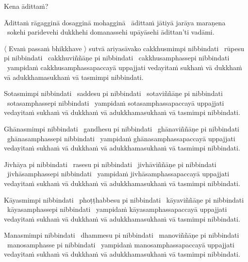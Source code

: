 Kena ādittaṁ?

\begin{pali-hang}
  Ādittaṁ rāgagginā dosagginā mohagginā \breathmark\ ādittaṁ jātiyā jarāya maraṇena \breathmark\ sokehi paridevehi dukkhehi domanassehi upāyāsehi ādittan'ti vadāmi.
\end{pali-hang}

\begin{pali-hang}
  〈 Evaṁ passaṁ bhikkhave 〉 sutvā ariyasāvako cakkhusmimpi nibbindati \breathmark\ rūpesu pi nibbindati \breathmark\ cakkhuviññāṇe pi nibbindati \breathmark\ cakkhusamphassepi nibbindati \breathmark\ yampidaṁ cakkhusamphassapaccayā uppajjati vedayitaṁ sukhaṁ vā dukkhaṁ vā adukkhamasukhaṁ vā tasmimpi nibbindati.
\end{pali-hang}

\begin{pali-hang}
  Sotasmimpi nibbindati \breathmark\ saddesu pi nibbindati \breathmark\ sotaviññāṇe pi nibbindati \breathmark\ sotasamphassepi nibbindati \breathmark\ yampidaṁ sotasamphassapaccayā uppajjati vedayitaṁ sukhaṁ vā dukkhaṁ vā adukkhamasukhaṁ vā tasmimpi nibbindati.
\end{pali-hang}

\begin{pali-hang}
  Ghānasmimpi nibbindati \breathmark\ gandhesu pi nibbindati \breathmark\ ghānaviññāṇe pi nibbindati \breathmark\ ghānasamphassepi nibbindati \breathmark\ yampidaṁ ghānasamphassapaccayā uppajjati vedayitaṁ sukhaṁ vā dukkhaṁ vā adukkhamasukhaṁ vā tasmimpi nibbindati.
\end{pali-hang}

\begin{pali-hang}
  Jivhāya pi nibbindati \breathmark\ rasesu pi nibbindati \breathmark\ jivhāviññāṇe pi nibbindati \breathmark\ jivhāsamphassepi nibbindati \breathmark\ yampidaṁ jivhāsamphassapaccayā uppajjati vedayitaṁ sukhaṁ vā dukkhaṁ vā adukkhamasukhaṁ vā tasmimpi nibbindati.
\end{pali-hang}

\begin{pali-hang}
  Kāyasmimpi nibbindati \breathmark\ phoṭṭhabbesu pi nibbindati \breathmark\ kāyaviññāṇe pi nibbindati \breathmark\ kāyasamphassepi nibbindati \breathmark\ yampidaṁ kāyasamphassapaccayā uppajjati vedayitaṁ sukhaṁ vā dukkhaṁ vā adukkhamasukhaṁ vā tasmimpi nibbindati.
\end{pali-hang}

\begin{pali-hang}
  Manasmimpi nibbindati \breathmark\ dhammesu pi nibbindati \breathmark\ manoviññāṇe pi nibbindati \breathmark\ manosamphasse pi nibbindati \breathmark\ yampidaṁ manosamphassapaccayā uppajjati vedayitaṁ sukhaṁ vā dukkhaṁ vā adukkhamasukhaṁ vā tasmimpi nibbindati.
\end{pali-hang}

